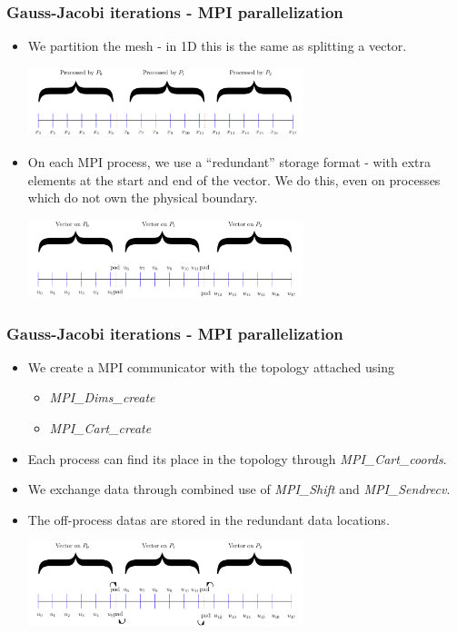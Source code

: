 \documentclass{beamer}
\begin{document}
\begin{frame}\frametitle{Gauss-Jacobi iterations - MPI parallelization}
  \begin{itemize}
    \item We partition the mesh - in 1D this is the same as splitting a vector.
      \begin{center}
        \includegraphics[width=8cm]{meshsplit}
      \end{center}
    \item On each MPI process, we use a ``redundant'' storage format - with extra elements at the start and end of the vector.
          We do this, even on processes which do not own the physical boundary.
      \begin{center}
        \includegraphics[width=8cm]{redundant}
      \end{center}
  \end{itemize}
\end{frame}
\begin{frame}\frametitle{Gauss-Jacobi iterations - MPI parallelization}
  \begin{itemize}
    \item We create a MPI communicator with the topology attached using
      \begin{itemize}
        \item \emph{MPI\_Dims\_create}
        \item \emph{MPI\_Cart\_create}
      \end{itemize}
    \item Each process can find its place in the topology through \emph{MPI\_Cart\_coords}.
    \item We exchange data through combined use of \emph{MPI\_Shift} and \emph{MPI\_Sendrecv}.
    \item The off-process datas are stored in the redundant data locations.
      \begin{center}
        \includegraphics[width=8cm]{dataexchange}
      \end{center}
  \end{itemize}
\end{frame}
\end{document}
